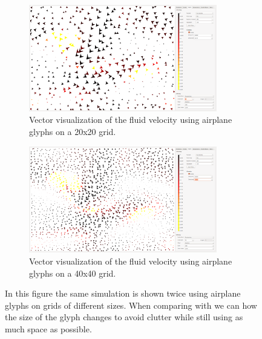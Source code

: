 \begin{figure}[tbh]
	\centering
	\begin{subfigure}{0.45\textwidth}
		\centering
		\includegraphics[width=0.9\textwidth, trim={35px 30px 430px 30px}, clip]{img/glyphs/scaling_20}
		\caption{Vector visualization of the fluid velocity using airplane glyphs on a 20x20 grid.}
		\label{fig:scaling:20}
	\end{subfigure}
	\hspace{30px}
	\begin{subfigure}{0.45\textwidth}	
		\centering
		\includegraphics[width=0.9\textwidth, trim={35px 30px 430px 30px}, clip]{img/glyphs/scaling_40}
		\caption{Vector visualization of the fluid velocity using airplane glyphs on a 40x40 grid.}
		\label{fig:scaling:40}
	\end{subfigure}
	\caption{In this figure the same simulation is shown twice using airplane glyphs on grids of different sizes. When comparing  with  we can how the size of the glyph changes to avoid clutter while still using as much space as possible. }
	\label{fig:scaling}
\end{figure}




